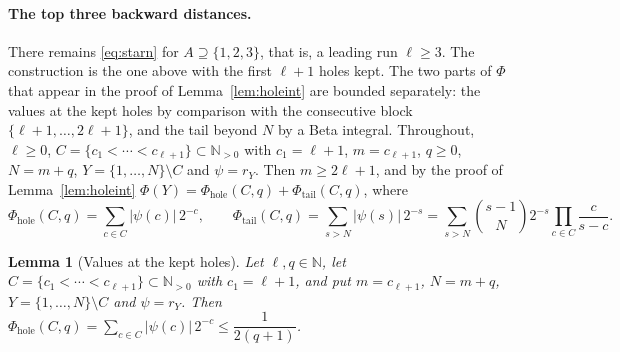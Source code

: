 \documentclass[11pt]{article}
\newtheorem{lemma}[theorem]{Lemma}
\newcommand{\N}{\mathbb N}
\begin{document}
\paragraph{The top three backward distances.}
There remains \eqref{eq:starn} for $A\supseteq\{1,2,3\}$, that is, a leading run
$\ell\ge3$.  The construction is the one above with the first $\ell+1$ holes kept.
The two parts of $\Phi$ that appear in the proof of Lemma~\ref{lem:holeint}
are bounded separately: the values at the kept holes by comparison with the
consecutive block $\{\ell+1,\ldots,2\ell+1\}$, and the tail beyond $N$ by a Beta
integral.  Throughout, $\ell\ge0$, $C=\{c_1<\cdots<c_{\ell+1}\}\subset\N_{>0}$ with
$c_1=\ell+1$, $m=c_{\ell+1}$, $q\ge0$, $N=m+q$, $Y=\{1,\ldots,N\}\setminus C$ and
$\psi=r_Y$.  Then $m\ge2\ell+1$, and by the proof of Lemma~\ref{lem:holeint}
$\Phi(Y)=\Phi_{\mathrm{hole}}(C,q)+\Phi_{\mathrm{tail}}(C,q)$, where
\[
  \Phi_{\mathrm{hole}}(C,q)=\sum_{c\in C}|\psi(c)|\,2^{-c},\qquad
  \Phi_{\mathrm{tail}}(C,q)=\sum_{s>N}|\psi(s)|\,2^{-s}
        =\sum_{s>N}\binom{s-1}N2^{-s}\prod_{c\in C}\frac c{s-c}.
\]

\begin{lemma}[Values at the kept holes]\label{lem:holevals}
Let $\ell,q\in\N$, let $C=\{c_1<\cdots<c_{\ell+1}\}\subset\N_{>0}$
with $c_1=\ell+1$, and put $m=c_{\ell+1}$, $N=m+q$,
$Y=\{1,\ldots,N\}\setminus C$ and $\psi=r_Y$.  Then
$\Phi_{\mathrm{hole}}(C,q)=\sum_{c\in C}|\psi(c)|\,2^{-c}\le\dfrac1{2(q+1)}$.
\end{lemma}
\end{document}
